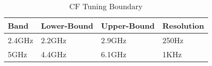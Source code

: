 \begin{table}[tb]
	\caption{CF Tuning Boundary }
	\label{tab:cf_tuning_range}
	\centering

	\begin{tabular}{llll}
	\hline

	\hline
	\textbf{Band} & \textbf{Lower-Bound} & \textbf{Upper-Bound} & \textbf{Resolution} \\
	\hline
	2.4GHz & 2.2GHz & 2.9GHz & 250Hz \\
	\hline
	5GHz   & 4.4GHz & 6.1GHz & 1KHz \\
	\hline

	\hline
	\end{tabular}
\end{table}
